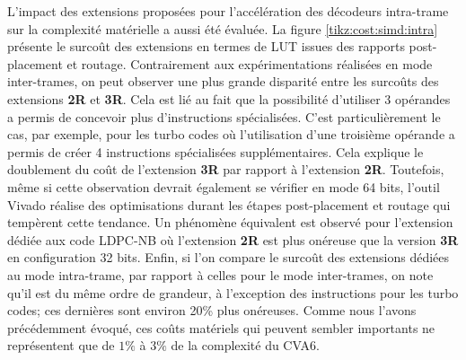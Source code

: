 \documentclass[../main.tex]{subfiles}
\begin{document}
L'impact des extensions proposées pour l'accélération des décodeurs intra-trame sur la complexité matérielle a aussi été évaluée.
La figure \ref{tikz:cost:simd:intra} présente le surcoût des extensions en termes de LUT issues des rapports post-placement et routage.
Contrairement aux expérimentations réalisées en mode inter-trames, on peut observer une plus grande disparité entre les surcoûts des extensions \textbf{2R} et \textbf{3R}. 
Cela est lié au fait que la possibilité d'utiliser $3$ opérandes a permis de concevoir plus d'instructions spécialisées. 
C'est particulièrement le cas, par exemple, pour les turbo codes où l'utilisation d'une troisième opérande a permis de créer 4 instructions spécialisées supplémentaires.
Cela explique le doublement du coût de l'extension \textbf{3R} par rapport à l'extension \textbf{2R}.
Toutefois, même si cette observation devrait également se vérifier en mode 64 bits, l'outil Vivado réalise des optimisations durant les étapes post-placement et routage qui tempèrent cette tendance.
Un phénomène équivalent est observé pour l'extension dédiée aux code LDPC-NB où l'extension \textbf{2R} est plus onéreuse que la version \textbf{3R} en configuration 32 bits.
Enfin, si l'on compare le surcoût des extensions dédiées au mode intra-trame, par rapport à celles pour le mode inter-trames, on note qu'il est du même ordre de grandeur, à l'exception des instructions pour les turbo codes; ces dernières sont environ 20\% plus onéreuses. 
Comme nous l'avons précédemment évoqué, ces coûts matériels qui peuvent sembler importants ne représentent que de $1\%$ à $3\%$ de la complexité du CVA6.
\end{document}
